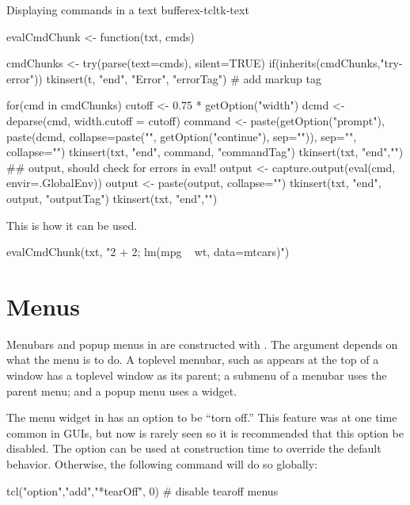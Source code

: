 \begin{example}{Displaying commands in a text buffer}{ex-tcltk-text}
\begin{Schunk}
\begin{Sinput}
 evalCmdChunk <- function(txt, cmds) {
   
   cmdChunks <- try(parse(text=cmds), silent=TRUE)
   if(inherits(cmdChunks,"try-error")) {
     tkinsert(t, "end", "Error", "errorTag") # add markup tag
   }
 
   for(cmd in cmdChunks) {
     cutoff <- 0.75 * getOption("width")
     dcmd <- deparse(cmd, width.cutoff = cutoff)
     command <- 
       paste(getOption("prompt"),
             paste(dcmd, collapse=paste("\n", 
                           getOption("continue"), sep="")),
             sep="", collapse="")
     tkinsert(txt, "end", command, "commandTag")
     tkinsert(txt, "end","\n")
     ## output, should check for errors in eval!
     output <- capture.output(eval(cmd, envir=.GlobalEnv))
     output <- paste(output, collapse="\n")
     tkinsert(txt, "end", output, "outputTag")
     tkinsert(txt, "end","\n")
   }
 }
\end{Sinput}
\end{Schunk}



This is how it can be used.
\begin{Schunk}
\begin{Sinput}
 evalCmdChunk(txt, "2 + 2; lm(mpg ~ wt, data=mtcars)")
\end{Sinput}
\end{Schunk}
\end{example}



\section{Menus}
\label{sec:tcltk:menus}

Menubars and popup menus in \Tk\/ are constructed with
. The  argument depends on what the menu is
to do. A toplevel menubar, such as appears at the top of a window has
a toplevel window as its parent; a submenu of a menubar uses the
parent menu; and a popup menu uses a widget.  

The menu widget in \Tk\/ has an option to be ``torn off.'' This
feature was at one time common in GUIs, but now is rarely seen so it
is recommended that this option be disabled. The
 option can be used at construction time to
override the default behavior. Otherwise, the following command will
do so globally:
\begin{Schunk}
\begin{Sinput}
 tcl("option","add","*tearOff", 0)    # disable tearoff menus
\end{Sinput}
\end{Schunk}
%

